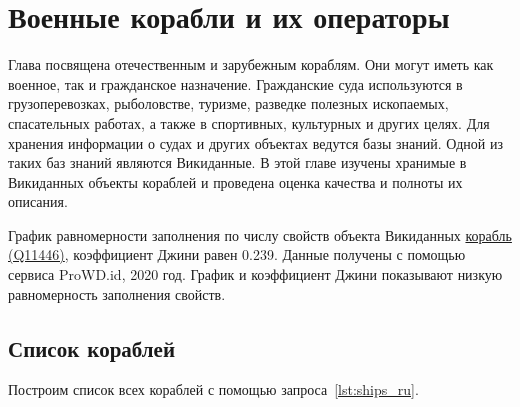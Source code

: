 \chapter{Военные корабли и их операторы}
\label{ch:ships-chapter}

Глава посвящена отечественным и зарубежным кораблям. Они могут иметь как военное, так и гражданское назначение. Гражданские суда используются в грузоперевозках, рыболовстве, туризме, разведке полезных ископаемых, спасательных работах, а также в спортивных, культурных и других целях. Для хранения информации о судах и других объектах ведутся базы знаний. Одной из таких баз знаний являются Викиданные. В этой главе изучены хранимые в Викиданных объекты кораблей и проведена оценка качества и полноты их описания.


\begin{marginfigure}[0.0cm]
  {
    \setlength{\fboxsep}{0pt}%
    \setlength{\fboxrule}{1pt}%
  }
  \caption[График равномерности заполнения свойств объектов Викиданных.]{График равномерности заполнения по числу свойств объекта Викиданных \href{https://www.wikidata.org/wiki/Q11446}{корабль (Q11446)}, коэффициент Джини равен 0.239. Данные получены с помощью сервиса ProWD.id, 2020 год. График и коэффициент Джини показывают низкую равномерность заполнения свойств.}%
  \label{fig:prowd_ships-unbalanced}%
\end{marginfigure}


\section{Список кораблей}


Построим список всех кораблей с помощью запроса~\ref{lst:ships_ru}.

